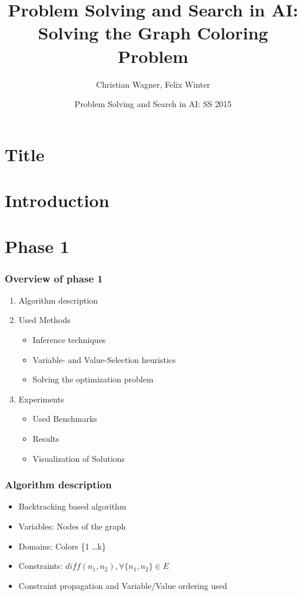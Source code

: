 \documentclass{beamer}
\title[Solving the Graph Coloring Problem] %
{Problem Solving and Search in AI: Solving the Graph Coloring
Problem}
\author{Christian Wagner, Felix Winter}
\institute
{
  TU Wien  
}
\date[SS 2015] %
{Problem Solving and Search in AI: SS 2015}
\begin{document}
\section{Title}
  \frame{\titlepage}


\section{Introduction}




\section{Phase 1}
  \begin{frame}
    \frametitle{Overview of phase 1}

    \begin{enumerate}
      \item Algorithm description
      \item Used Methods
        \begin{itemize}
        \item{Inference techniques}
        \item{Variable- and Value-Selection heuristics}
        \item{Solving the optimization problem}
        \end{itemize}
        
      \item{Experiments}
        \begin{itemize}
        \item{Used Benchmarks}
        \item{Results}
        \item{Visualization of Solutions}
        \end{itemize}

    \end{enumerate}
  \end{frame}


  \begin{frame}
    \frametitle{Algorithm description}
    \begin{itemize}
    \item{Backtracking based algorithm}
    \item{Variables: Nodes of the graph}
    \item{Domains: Colors \{1 \dots k\}}
    \item{Constraints: $diff(n_1, n_2),  \forall \{n_1, n_2\} \in E$}
    \item{Constraint propagation and Variable/Value ordering used}
    \end{itemize}


  \end{frame}
\end{document}
